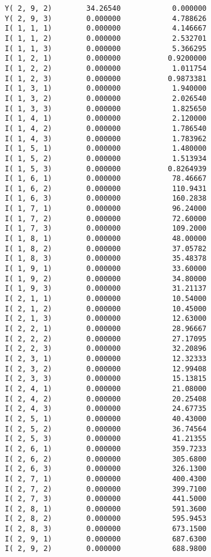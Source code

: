 \documentclass[12pt]{article}
\begin{document}
\begin{appendices}
\begin{lstlisting}
Y( 2, 9, 2)        34.26540            0.000000
Y( 2, 9, 3)        0.000000            4.788626
I( 1, 1, 1)        0.000000            4.146667
I( 1, 1, 2)        0.000000            2.532701
I( 1, 1, 3)        0.000000            5.366295
I( 1, 2, 1)        0.000000           0.9200000
I( 1, 2, 2)        0.000000            1.011754
I( 1, 2, 3)        0.000000           0.9873381
I( 1, 3, 1)        0.000000            1.940000
I( 1, 3, 2)        0.000000            2.026540
I( 1, 3, 3)        0.000000            1.825650
I( 1, 4, 1)        0.000000            2.120000
I( 1, 4, 2)        0.000000            1.786540
I( 1, 4, 3)        0.000000            1.783962
I( 1, 5, 1)        0.000000            1.480000
I( 1, 5, 2)        0.000000            1.513934
I( 1, 5, 3)        0.000000           0.8264939
I( 1, 6, 1)        0.000000            78.46667
I( 1, 6, 2)        0.000000            110.9431
I( 1, 6, 3)        0.000000            160.2838
I( 1, 7, 1)        0.000000            96.24000
I( 1, 7, 2)        0.000000            72.60000
I( 1, 7, 3)        0.000000            109.2000
I( 1, 8, 1)        0.000000            48.00000
I( 1, 8, 2)        0.000000            37.05782
I( 1, 8, 3)        0.000000            35.48378
I( 1, 9, 1)        0.000000            33.60000
I( 1, 9, 2)        0.000000            34.80000
I( 1, 9, 3)        0.000000            31.21137
I( 2, 1, 1)        0.000000            10.54000
I( 2, 1, 2)        0.000000            10.45000
I( 2, 1, 3)        0.000000            12.63000
I( 2, 2, 1)        0.000000            28.96667
I( 2, 2, 2)        0.000000            27.17095
I( 2, 2, 3)        0.000000            32.20896
I( 2, 3, 1)        0.000000            12.32333
I( 2, 3, 2)        0.000000            12.99408
I( 2, 3, 3)        0.000000            15.13815
I( 2, 4, 1)        0.000000            21.08000
I( 2, 4, 2)        0.000000            20.25408
I( 2, 4, 3)        0.000000            24.67735
I( 2, 5, 1)        0.000000            40.43000
I( 2, 5, 2)        0.000000            36.74564
I( 2, 5, 3)        0.000000            41.21355
I( 2, 6, 1)        0.000000            359.7233
I( 2, 6, 2)        0.000000            305.6800
I( 2, 6, 3)        0.000000            326.1300
I( 2, 7, 1)        0.000000            400.4300
I( 2, 7, 2)        0.000000            399.7100
I( 2, 7, 3)        0.000000            441.5000
I( 2, 8, 1)        0.000000            591.3600
I( 2, 8, 2)        0.000000            595.9453
I( 2, 8, 3)        0.000000            673.1500
I( 2, 9, 1)        0.000000            687.6300
I( 2, 9, 2)        0.000000            688.9800

\end{lstlisting}
\end{appendices}
\end{document}

